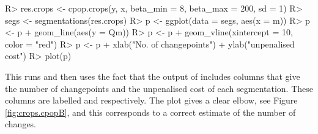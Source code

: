\documentclass[nojss]{jss}
\begin{document}
\begin{CodeChunk}
\begin{CodeInput}
R> res.crops <- cpop.crops(y, x, beta_min = 8, beta_max = 200, sd = 1)
R> segs <- segmentations(res.crops)
R> p <- ggplot(data = segs, aes(x = m))
R> p <- p + geom_line(aes(y = Qm))
R> p <- p + geom_vline(xintercept = 10, color = "red")
R> p <- p + xlab("No. of changepoints") + ylab("unpenalised cost")
R> plot(p)
\end{CodeInput}
\end{CodeChunk}
This runs  and then uses the fact that the output of  includes columns that give the number of changepoints and the unpenalised cost of each segmentation. These columns are labelled  and  respectively.
The plot gives a clear elbow, see Figure \ref{fig:crops.cpopB}, and this corresponds to a correct estimate of the number of changes. %
%
%
\end{document}
